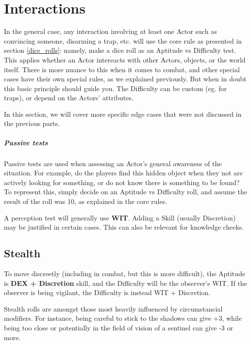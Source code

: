
\chapter{Interactions}

In the general case, any interaction involving at least one Actor such as convincing someone, disarming a trap, etc. will use the core rule as presented in section \ref{dice_rolls}: namely, make a dice roll as an Aptitude vs Difficulty test. This applies whether an Actor intereacts with other Actors, objects, or the world itself. There is more nuance to this when it comes to combat, and other special cases have their own special rules, as we explained previously. But when in doubt this basic principle should guide you. The Difficulty can be custom (eg. for traps), or depend on the Actors' attributes. 

In this section, we will cover more specific edge cases that were not discussed in the previous parts.

\paragraph{Passive tests} 

Passive tests are used when assessing an Actor's general awareness of the situation. For example, do the players find this hidden object when they not are actively looking for something, or do not know there is something to be found? To represent this, simply decide on an Aptitude vs Difficulty roll, and assume the result of the roll was 10, as explained in the core rules.

A perception test will generally use \textbf{WIT}. Adding a Skill (usually Discretion) may be justified in certain cases. This can also be relevant for knowledge checks.

\section{Stealth} 

To move discreetly (including in combat, but this is more difficult), the Aptitude is \textbf{DEX + Discretion} skill, and the Difficulty will be the observer's WIT. If the observer is being vigilant, the Difficulty is instead WIT + Discretion.

Stealth rolls are amongst those most heavily influenced by circumstancial modifiers. For instance, being careful to stick to the shadows can give +3, while being too close or potentially in the field of vision of a sentinel can give -3 or more.	

